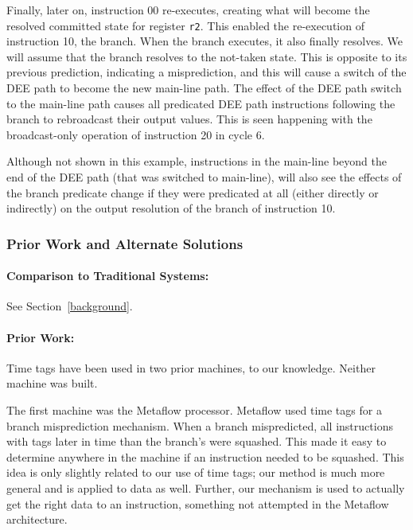 \documentclass[10pt,dvips]{article}
\begin{document}
Finally, later on, instruction 00
re-executes, creating what will become the resolved committed
state for register
{\tt r2}.
This enabled the re-execution of instruction 10, the branch.
When the branch executes, it also finally resolves.
We will assume that the branch resolves to the not-taken
state.  This is opposite to its previous prediction, indicating
a misprediction, and this will cause a switch of the
DEE path to become the new main-line path.
The effect of the DEE path switch to the main-line path
causes all predicated DEE path instructions following the branch
to rebroadcast their output values.  This is seen
happening with the broadcast-only operation of
instruction 20 in cycle 6.

Although not shown in this example, instructions in the main-line
beyond the end of the DEE path (that was switched to main-line),
will also see the effects of the branch predicate change
if they were predicated at all (either directly or indirectly)
on the output resolution of the branch of instruction 10.


\subsubsection{Prior Work and Alternate Solutions}
\label{priorwork}
\paragraph{Comparison to Traditional Systems: }
See Section~\ref{background}.

\paragraph{Prior Work: }
Time tags have been used in two prior machines, to our knowledge.
Neither machine was built.

The first machine was the Metaflow processor\cite{Popescu91}.
Metaflow used time tags for a branch misprediction mechanism.
When a branch mispredicted, all instructions with tags
later in time than the branch's were squashed. This made it
easy to determine anywhere in the machine if an instruction needed
to be squashed. This idea is only slightly related to our
use of time tags; our method is much more general and is applied
to data as well. Further, our mechanism is used to actually get the
right data to an instruction, something not attempted in
the Metaflow architecture.
\end{document}
